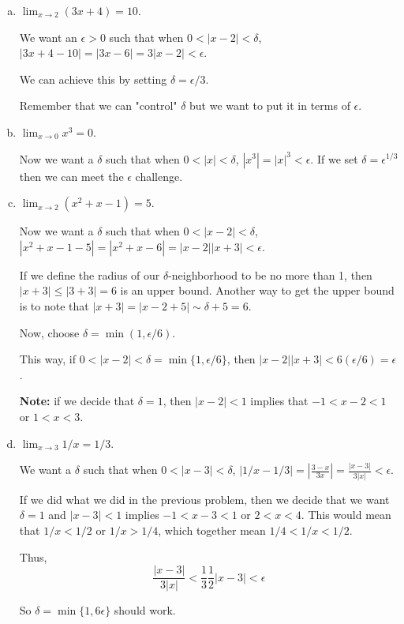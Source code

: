\begin{enumerate}[(a)]
\item $\lim_{x\rightarrow 2} \left(3x + 4\right) = 10$.

We want an $\epsilon > 0$ such that when
$0 < |x-2| < \delta$,
$|3x +4 - 10| = |3x -6| = 3|x-2| < \epsilon$.

We can achieve this by setting $\delta = \epsilon / 3$.

Remember that we can "control" $\delta$ but we want to put it in terms of $\epsilon$.



\item $\lim_{x\rightarrow 0} x^3 = 0$.

Now we want a $\delta$ such that when $0 < |x| < \delta$, $|x^3| = |x|^3 < \epsilon$.
If we set $\delta = \epsilon^{1/3}$ then we can meet the $\epsilon$ challenge.


\item $\lim_{x\rightarrow 2} \left(x^2 + x - 1\right) = 5$.

Now we want a $\delta$ such that when $0 < |x-2| < \delta$, $|x^2 + x -1 - 5| = |x^2 + x - 6| = |x-2||x+3| < \epsilon$.

If we define the radius of our $\delta$-neighborhood to be no more than 1, then $|x+3| \leq |3+3| = 6$ is an upper bound.
Another way to get the upper bound is to note that $|x+3| = |x-2 + 5| \sim \delta + 5 = 6$.

Now, choose $\delta = \min(1, \epsilon/6)$.

This way, if $0 < |x-2| < \delta = \min\{ 1, \epsilon/6 \}$, then
$|x-2||x+3| < 6 (\epsilon/ 6) = \epsilon$.


\textbf{Note:} if we decide that $\delta = 1$, then $|x-2| <1$ implies that $-1 < x-2 < 1$ or $1 < x < 3$.

\item $\lim_{x\rightarrow 3} 1/x = 1/3$.

We want a $\delta$ such that when $0 < |x-3| < \delta$,
$|1/x - 1/3| = \left| \frac{3-x}{3x} \right| = \frac{|x-3|}{3|x|} < \epsilon$.

If we did what we did in the previous problem, then we decide that we want $\delta = 1$ and $|x-3| < 1$
implies $-1 < x-3 < 1$ or $2 < x < 4$.
This would mean that $1/x < 1/2$ or $1/x > 1/4$, which together mean $1/4 < 1/x < 1/2$.

Thus,
$$
\frac{|x-3|}{3|x|} < \frac{1}{3} \frac{1}{2} |x-3| < \epsilon
$$

So $\delta = \min\{ 1, 6\epsilon \}$ should work.

\end{enumerate}




